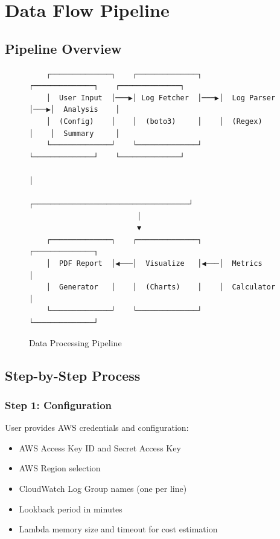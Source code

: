 \documentclass[12pt,a4paper]{article}
\begin{document}
\pagebreak

\section{Data Flow Pipeline}

\subsection{Pipeline Overview}

\begin{figure}[htbp]
    \centering
    \begin{verbatim}
    ┌──────────────┐    ┌──────────────┐    ┌──────────────┐    ┌──────────────┐
    │  User Input  │───▶│ Log Fetcher  │───▶│  Log Parser  │───▶│  Analysis    │
    │  (Config)    │    │  (boto3)     │    │  (Regex)     │    │  Summary     │
    └──────────────┘    └──────────────┘    └──────────────┘    └──────────────┘
                                                              │
                         ┌────────────────────────────────────┘
                         │
                         ▼
    ┌──────────────┐    ┌──────────────┐    ┌──────────────┐
    │  PDF Report  │◀───│  Visualize   │◀───│  Metrics     │
    │  Generator   │    │  (Charts)    │    │  Calculator  │
    └──────────────┘    └──────────────┘    └──────────────┘
    \end{verbatim}
    \caption{Data Processing Pipeline}
\end{figure}

\subsection{Step-by-Step Process}

\subsubsection{Step 1: Configuration}
User provides AWS credentials and configuration:
\begin{itemize}
    \item AWS Access Key ID and Secret Access Key
    \item AWS Region selection
    \item CloudWatch Log Group names (one per line)
    \item Lookback period in minutes
    \item Lambda memory size and timeout for cost estimation
\end{itemize}
\end{document}
